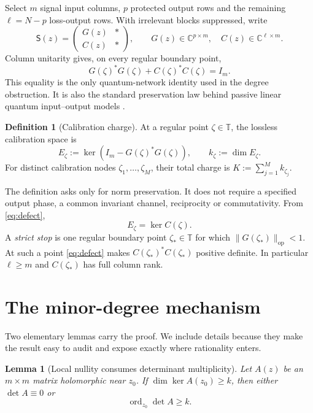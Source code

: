 \documentclass[11pt]{article}
\newtheorem{lemma}[theorem]{Lemma}
\theoremstyle{definition}
\newtheorem{definition}[theorem]{Definition}
\theoremstyle{remark}
\newcommand{\C}{\mathbb{C}}
\newcommand{\T}{\mathbb{T}}
\newcommand{\ord}{\operatorname{ord}}
\newcommand{\op}{\mathrm{op}}
\begin{document}
Select $m$ signal input columns, $p$ protected output rows and the remaining
$\ell=N-p$ loss-output rows.  With irrelevant blocks suppressed, write
\begin{equation}\label{eq:partition}
 \mathsf S(z)=
 \begin{pmatrix}
   G(z)& *\\ C(z)& *
 \end{pmatrix},
 \qquad
 G(z)\in\C^{p\times m},\quad C(z)\in\C^{\ell\times m}.
\end{equation}
Column unitarity gives, on every regular boundary point,
\begin{equation}\label{eq:defect}
 G(\zeta)^*G(\zeta)+C(\zeta)^*C(\zeta)=I_m.
\end{equation}
This equality is the only quantum-network identity used in the degree
obstruction.  It is also the standard preservation law behind passive linear
quantum input--output models
\cite{GoughJames2009,GoughZhang2015,NurdinEtAl2016}.

\begin{definition}[Calibration charge]\label{def:charge}
At a regular point $\zeta\in\T$, the lossless calibration space is
\[
 E_\zeta:=\ker\!\left(I_m-G(\zeta)^*G(\zeta)\right),
 \qquad k_\zeta:=\dim E_\zeta.
\]
For distinct calibration nodes $\zeta_1,\ldots,\zeta_M$, their total charge is
$K:=\sum_{j=1}^M k_{\zeta_j}$.
\end{definition}

The definition asks only for norm preservation.  It does not require a
specified output phase, a common invariant channel, reciprocity or
commutativity.  From \eqref{eq:defect},
\begin{equation}\label{eq:kernelidentity}
 E_\zeta=\ker C(\zeta).
\end{equation}
A \emph{strict stop} is one regular boundary point $\zeta_*\in\T$ for which
$\|G(\zeta_*)\|_{\op}<1$.  At such a point \eqref{eq:defect} makes
$C(\zeta_*)^*C(\zeta_*)$ positive definite.  In particular $\ell\geq m$ and
$C(\zeta_*)$ has full column rank.

\section{The minor-degree mechanism}

Two elementary lemmas carry the proof.  We include details because they make
the result easy to audit and expose exactly where rationality enters.

\begin{lemma}[Local nullity consumes determinant multiplicity]
\label{lem:nullity}
Let $A(z)$ be an $m\times m$ matrix holomorphic near $z_0$.  If
$\dim\ker A(z_0)\geq k$, then either $\det A\equiv0$ or
\begin{equation}\label{eq:nullityorder}
 \ord_{z_0}\det A\geq k.
\end{equation}
\end{lemma}
\end{document}
